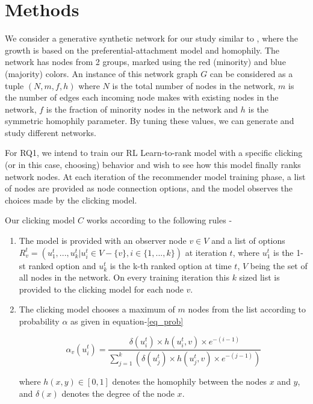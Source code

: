 \section{Methods}

We consider a generative synthetic network for our study similar to \cite{karimi2018homophily}, where the growth is based on the preferential-attachment model and homophily. The network has nodes from 2 groups, marked using the red (minority) and blue (majority) colors. An instance of this network graph $G$ can be considered as a tuple $(N,m,f,h)$ where $N$ is the total number of nodes in the network, $m$ is the number of edges each incoming node makes with existing nodes in the network, $f$ is the fraction of minority nodes in the network and $h$ is the symmetric homophily parameter. By tuning these values, we can generate and study different networks.

For RQ1, we intend to train our RL Learn-to-rank model with a specific clicking (or in this case, choosing) behavior and wish to see how this model finally ranks network nodes. At each iteration of the recommender model training phase, a list of nodes are provided as node connection options, and the model observes the choices made by the clicking model. 

\bigskip

{\setlength{\parindent}{0cm}
Our clicking model $C$ works according to the following rules - 
}
\begin{enumerate}
	
	\item The model is provided with an observer node $v \in V$ and a list of options $R_{v}^{t}=(u_{1}^{t},...,u_{k}^{t} | u_{i}^{t} \in V - \{v\}, i \in \{1,...,k\})$ at iteration $t$, where $u_{1}^{t}$ is the 1-st ranked option and $u_{k}^{t}$ is the k-th ranked option at time $t$, $V$ being the set of all nodes in the network. On every training iteration this $k$ sized list is provided to the clicking model for each node $v$.
	
	\item The clicking model chooses a maximum of $m$ nodes from the list according to probability $\alpha$ as given in equation-\ref{eq_prob}
	
	\begin{equation}
	\alpha_{v}(u_{i}^{t}) = \frac{\delta(u_{i}^{t}) \times h(u_{i}^{t},v) \times e^{-(i-1)}}{\sum\limits_{j = 1}^{k} (\delta(u_{j}^{t}) \times h(u_{j}^{t},v) \times e^{-(j-1)})} \label{eq_prob}
	\end{equation}
	
	where $h(x,y) \in [0,1]$ denotes the homophily between the nodes $x$ and $y$, and $\delta(x)$ denotes the degree of the node $x$.
\end{enumerate}

